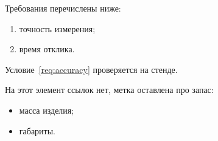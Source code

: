 Требования перечислены ниже:

\begin{enumerate}
  \item[а)] точность измерения\label{req:accuracy};
  \item[б)] время отклика.
\end{enumerate}

Условие~\ref{req:accuracy} проверяется на стенде.

На этот элемент ссылок нет, метка оставлена про запас:

\begin{itemize}
  \item масса изделия\label{req:mass};
  \item габариты.
\end{itemize}
